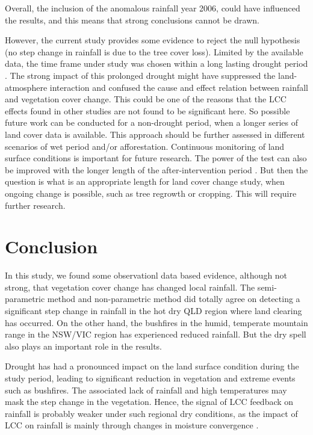 \documentclass[authoryear,preprint,review,12pt]{elsarticle}
\begin{document}
Overall, the inclusion of the anomalous rainfall year 2006, could have influenced the results, and this means that strong conclusions cannot be drawn.

However, the current study provides some evidence to reject the null hypothesis (no step change in rainfall is due to the tree cover loss). Limited by the available data, the time frame under study was chosen within a long lasting drought period \citep{Holper2011}. The strong impact of this prolonged drought might have suppressed the land-atmosphere interaction and confused the cause and effect relation between rainfall and vegetation cover change. This could be one of the reasons that the LCC effects found in other studies \citep[e.g.]{Gorgen2006,McAlpine2007} are not found to be significant here. So possible future work can be conducted for a non-drought period, when a longer series of land cover data is available. This approach should be further assessed in different scenarios of wet period and/or afforestation. Continuous monitoring of land surface conditions is important for future research. The power of the test can also be improved with the longer length of the after-intervention period \citep{Hirsch1985}. But then the question is what is an appropriate length for land cover change study, when ongoing change is possible, such as tree regrowth or cropping. This will require further research.

\section{Conclusion}

In this study, we found some observationl data based evidence, although not strong, that vegetation cover change has changed local rainfall. The semi-parametric method and non-parametric method did totally agree on detecting a significant step change in rainfall in the hot dry QLD region where land clearing has occurred. On the other hand, the bushfires in the humid, temperate mountain range in the NSW/VIC region has experienced reduced rainfall. But the dry spell also plays an important role in the results. 

Drought has had a pronounced impact on the land surface condition during the study period, leading to significant reduction in vegetation and extreme events such as bushfires. The associated lack of rainfall and high temperatures may mask the step change in the vegetation. Hence, the signal of LCC feedback on rainfall is probably weaker under such regional dry conditions, as the impact of LCC on rainfall is mainly through changes in moisture convergence \citep{Gorgen2006,Pitman2007}.
\end{document}
